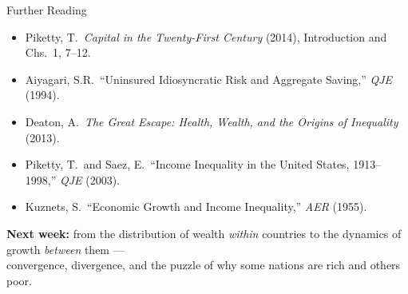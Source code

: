 \documentclass[aspectratio=169, 10pt]{beamer}
\begin{document}
\begin{frame}{Further Reading}
\begin{itemize}
  \item Piketty, T.\ \textit{Capital in the Twenty-First Century} (2014),
        Introduction and Chs.~1, 7--12.
  \item Aiyagari, S.R.\ ``Uninsured Idiosyncratic Risk and Aggregate Saving,''
        \textit{QJE} (1994).
  \item Deaton, A.\ \textit{The Great Escape: Health, Wealth, and the Origins
        of Inequality} (2013).
  \item Piketty, T.\ and Saez, E.\ ``Income Inequality in the United States,
        1913--1998,'' \textit{QJE} (2003).
  \item Kuznets, S.\ ``Economic Growth and Income Inequality,''
        \textit{AER} (1955).
\end{itemize}
\vspace{1em}
\begin{center}
\textbf{Next week:} from the distribution of wealth \textit{within} countries
to the dynamics of growth \textit{between} them ---\\
convergence, divergence, and the puzzle of why some nations are rich
and others poor.
\end{center}
\end{frame}
\end{document}
